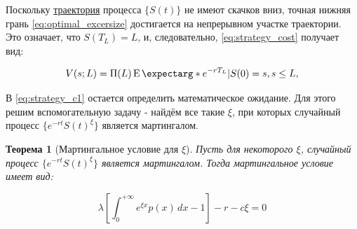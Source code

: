\documentclass[a4paper,12pt]{article}
\newtheorem{theorem}{Теорема}
\theoremstyle{definition}
\newcommand{\expect}{\operatorname{E}\expectarg}
\begin{document}
Поскольку \hyperref[fig:model1tracklcross]{траектория} процесса $\{S(t)\}$ не имеют скачков вниз, точная нижняя грань \eqref{eq:optimal_excersize} достигается на непрерывном участке траектории. Это означает, что $S(T_L) = L$, и, следовательно, \eqref{eq:strategy_cost} получает вид:

\begin{equation}\label{eq:strategy_c1}
V(s; L) = \Pi(L) \expect*{e^{-rT_L} | S(0) = s}, s \le L,
\end{equation}

В \eqref{eq:strategy_c1} остается определить математическое ожидание. Для этого решим вспомогательную задачу - найдём все такие $\xi$, при которых случайный процесс $\{e^{-rt}S(t)^{\xi}\}$ является мартингалом.

\begin{theorem}[Мартингальное условие для $\xi$]\label{thm:martingale_cond_for_xi}
Пусть для некоторого $\xi$, случайный процесс $\{e^{-rt}S(t)^{\xi}\}$ является мартингалом. Тогда мартингальное условие имеет вид:

\begin{equation}\label{eq:martingale_cond_for_xi_log}
\lambda \left[ \int_{0}^{+\infty} e^{\xi x} p(x) \,dx - 1  \right] - r - c \xi
 = 0
\end{equation}

\end{theorem}
\end{document}
